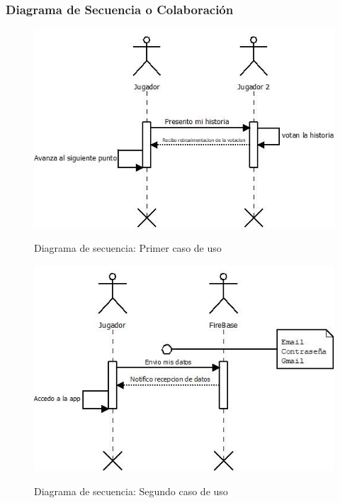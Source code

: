 \subsubsection{Diagrama de Secuencia o Colaboración}
\begin{figure}[htbp]
\centering
   \includegraphics[scale=0.9]{imgs/DS_1.jpeg}
   \begin{center}
   Diagrama de secuencia: Primer caso de uso
   \end{center}
\end{figure}

\begin{figure}[htbp]
\centering
   \includegraphics[scale=0.9]{imgs/DS_2.jpeg}
   \begin{center}
   Diagrama de secuencia: Segundo caso de uso
   \end{center}
\end{figure}

